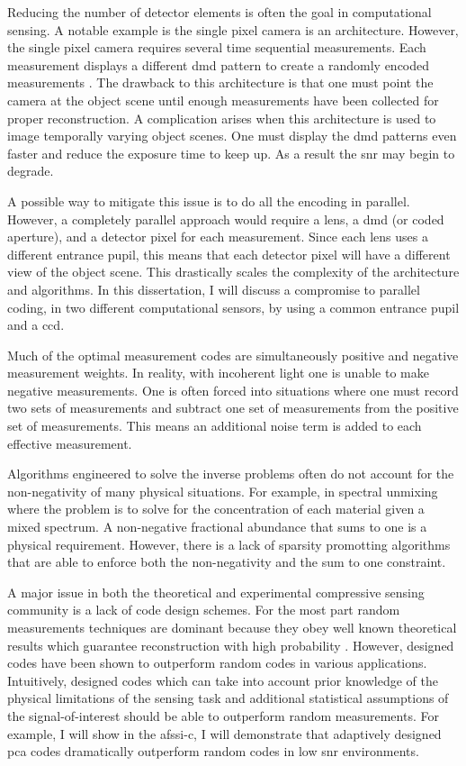 Reducing the number of detector elements is often the goal in computational sensing. A notable example is the single pixel camera is an architecture. However, the single pixel camera requires several time sequential measurements. Each measurement displays a different \gls{dmd} pattern to create a randomly encoded measurements \cite{duarte2008single}. The drawback to this architecture is that one must point the camera at the object scene until enough measurements have been collected for proper reconstruction. A complication arises when this architecture is used to image temporally varying object scenes. One must display the \gls{dmd} patterns even faster and reduce the exposure time to keep up. As a result the \gls{snr} may begin to degrade. 

A possible way to mitigate this issue is to do all the encoding in parallel. However, a completely parallel approach would require a lens, a \gls{dmd} (or coded aperture), and a detector pixel for each measurement. Since each lens uses a different entrance pupil, this means that each detector pixel will have a different view of the object scene. This drastically scales the complexity of the architecture and algorithms. In this dissertation, I will discuss a compromise to parallel coding, in two different computational sensors, by using a common entrance pupil and a \gls{ccd}.

Much of the optimal measurement codes are simultaneously positive and negative measurement weights. In reality, with incoherent light one is unable to make negative measurements. One is often forced into situations where one must record two sets of measurements and subtract one set of measurements from the positive set of measurements. This means an additional noise term is added to each effective measurement. 

Algorithms engineered to solve the inverse problems often do not account for the non-negativity of many physical situations. For example, in spectral unmixing where the problem is to solve for the concentration of each material given a mixed spectrum. A non-negative fractional abundance that sums to one is a physical requirement. However, there is a lack of sparsity promotting algorithms that are able to enforce both the non-negativity and the sum to one constraint. 

A major issue in both the theoretical and experimental compressive sensing community is a lack of code design schemes. For the most part random measurements techniques are dominant because they obey well known theoretical results which guarantee reconstruction with high probability \cite{donoho2006compressed, candes2008introduction, tropp2006just}. However, designed codes have been shown to outperform random codes in various applications. Intuitively, designed codes which can take into account prior knowledge of the physical limitations of the sensing task and additional statistical assumptions of the signal-of-interest should be able to outperform random measurements. For example, I will show in the \gls{afssi-c}, I will demonstrate that adaptively designed \gls{pca} codes dramatically outperform random codes in low \gls{snr} environments. 

